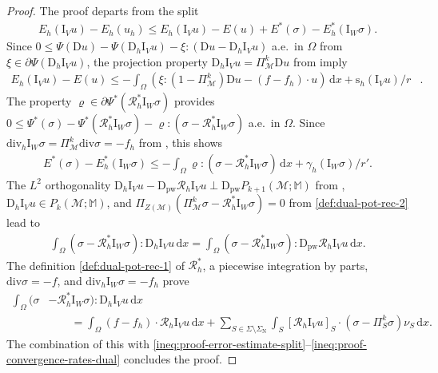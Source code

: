 \documentclass[10pt,a4paper]{amsart}
\newcommand{\D}{\mathrm{D}}
\newcommand{\I}{\mathrm{I}}
\newcommand{\M}{\mathbb{M}}
\newcommand{\Mcal}{\mathcal{M}}
\renewcommand{\d}[1]{\,\mathrm{d}#1}
\renewcommand{\div}{\mathrm{div}}
\newcommand{\pw}{\mathrm{pw}}
\newcommand{\s}{\mathrm{s}}
\begin{document}
\begin{proof}
	The proof departs from the split
	\begin{align}\label{ineq:proof-error-estimate-split}
		E_h(\I_V u) - E_h(u_h) \leq E_h(\I_V u) - E(u) + E^*(\sigma) - E_h^*(\I_W \sigma).
	\end{align}
	Since $0 \leq \Psi(\D u) - \Psi(\D_h \I_V u) - \xi : (\D u - \D_h \I_V u)$ a.e.~in $\Omega$ from $\xi \in \partial \Psi(\D_h \I_V u)$, the projection property $\D_h \I_V u = \Pi_\Mcal^k \D u$ from  imply
	\begin{align}\label{ineq:proof-convergence-rates-primal}
		E_h(\I_V u) - E(u) \leq - \int_\Omega (\xi : (1 - \Pi_\Mcal^k) \D u - (f - f_h) \cdot u) \d{x} + \s_h(\I_V u)/r&.
	\end{align}
	The property $\varrho \in \partial \Psi^*(\mathcal{R}_h^* \I_W \sigma)$ provides $0 \leq \Psi^*(\sigma) - \Psi^*(\mathcal{R}^*_h \I_W \sigma) - \varrho : (\sigma - \mathcal{R}^*_h \I_W \sigma)$ a.e.~in $\Omega$. Since $\div_h \I_W \sigma = \Pi_\Mcal^k \div \sigma = -f_h$ from , this shows
	\begin{align}\label{ineq:proof-convergence-rates-dual}
		E^*(\sigma) - E^*_h(\I_W \sigma) \leq - \int_\Omega \varrho : (\sigma - \mathcal{R}_h^* \I_W \sigma) \d{x} + \gamma_h(\I_W \sigma)/r'.
	\end{align}
	The $L^2$ orthogonality
	$\D_h \I_V u - \D_\pw \mathcal{R}_h \I_V u \perp \D_\pw P_{k+1}(\Mcal;\M)$ from , $\D_h \I_V u \in P_k(\Mcal;\M)$, and $\Pi_{Z(\Mcal)}(\Pi_\Mcal^k \sigma - \mathcal{R}_h^* \I_W \sigma) = 0$ from \eqref{def:dual-pot-rec-2} lead to
	\begin{align}\label{eq:proof-error-estimate-ibp-1}
		\int_\Omega (\sigma - \mathcal{R}_h^* \I_W \sigma) : \D_h \I_V u \d{x} = \int_\Omega (\sigma - \mathcal{R}_h^* \I_W \sigma) : \D_\pw \mathcal{R}_h \I_V u \d{x}.
	\end{align}
	The definition \eqref{def:dual-pot-rec-1} of $\mathcal{R}_h^*$, a piecewise integration by parts, $\div \sigma = - f$, and $\div_h \I_W \sigma = - f_h$ prove
	\begin{align}\label{eq:proof-error-estimate-ibp-2}
		\int_\Omega (\sigma &- \mathcal{R}_h^* \I_W \sigma) : \D_h\I_V u \d{x}\nonumber\\
		&\qquad = \int_\Omega (f - f_h) \cdot \mathcal{R}_h \I_V u \d{x}
		+ \sum_{S \in \Sigma \setminus \Sigma_\mathrm{N}} \int_S [\mathcal{R}_h \I_V u]_S \cdot (\sigma - \Pi_S^k \sigma) \nu_S \d{x}.
	\end{align}
	The combination of this with \eqref{ineq:proof-error-estimate-split}--\eqref{ineq:proof-convergence-rates-dual} concludes the proof.
\end{proof}
\end{document}
